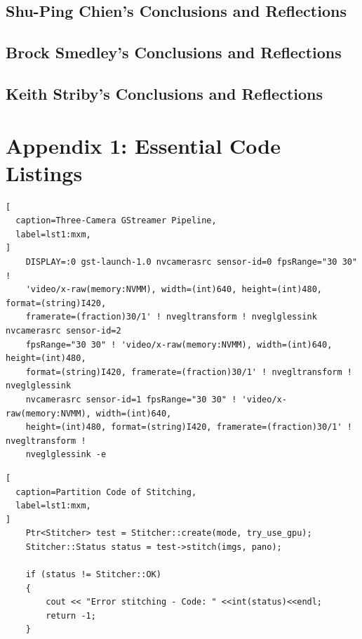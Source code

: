 \documentclass[letterpaper,10pt,serif,draftclsnofoot,onecolumn,compsoc,titlepage]{IEEEtran}
\begin{document}
	\subsection{Shu-Ping Chien's Conclusions and Reflections}

		

	\newpage

	\subsection{Brock Smedley's Conclusions and Reflections}

		

	\newpage
	
	\subsection{Keith Striby's Conclusions and Reflections}

		

	\newpage

\section{Appendix 1: Essential Code Listings}
\begin{lstlisting}[
  caption=Three-Camera GStreamer Pipeline,
  label=lst1:mxm,
]
	DISPLAY=:0 gst-launch-1.0 nvcamerasrc sensor-id=0 fpsRange="30 30" ! 
	'video/x-raw(memory:NVMM), width=(int)640, height=(int)480, format=(string)I420, 
	framerate=(fraction)30/1' ! nvegltransform ! nveglglessink  nvcamerasrc sensor-id=2 
	fpsRange="30 30" ! 'video/x-raw(memory:NVMM), width=(int)640, height=(int)480, 
	format=(string)I420, framerate=(fraction)30/1' ! nvegltransform ! nveglglessink 
	nvcamerasrc sensor-id=1 fpsRange="30 30" ! 'video/x-raw(memory:NVMM), width=(int)640, 
	height=(int)480, format=(string)I420, framerate=(fraction)30/1' ! nvegltransform ! 
	nveglglessink -e
\end{lstlisting}

\begin{lstlisting}[
  caption=Partition Code of Stitching,
  label=lst1:mxm,
]
	Ptr<Stitcher> test = Stitcher::create(mode, try_use_gpu);
    Stitcher::Status status = test->stitch(imgs, pano);
  
    if (status != Stitcher::OK)
    {
        cout << "Error stitching - Code: " <<int(status)<<endl;
        return -1;
    }
\end{lstlisting}
\end{document}
